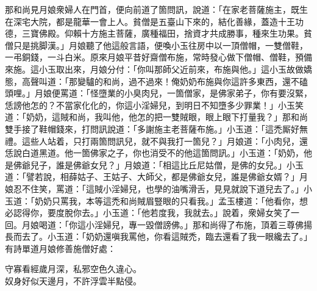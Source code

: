 那和尚見月娘衆婦人在門首，便向前道了箇問訊，說道：「在家老菩薩施主，既生在深宅大院，都是龍華一會上人。貧僧是五臺山下來的，結化善緣，蓋造十王功德，三寶佛殿。仰賴十方施主菩薩，廣種福田，捨資才共成勝事，種來生功果。貧僧只是挑脚漢。」月娘聽了他這般言語，便喚小玉往房中以一頂僧帽，一雙僧鞋，一弔銅錢，一斗白米。原來月娘平昔好齋僧布施，常時發心做下僧帽、僧鞋，預備來施。這小玉取出來，月娘分付：「你叫那師父近前來，布施與他。」這小玉故做嬌態，高聲叫道：「那變驢的和尚，過不過來！{}俺奶奶布施與你這許多東西，還不磕頭哩。」月娘便罵道：「怪墮業的小臭肉兒，一箇僧家，是佛家弟子，你有要沒緊，恁謗他怎的？不當家化化的，你這小淫婦兒，到明日不知墮多少罪業！」小玉笑道：「奶奶，這賊和尚，我叫他，他怎的把一雙賊眼，眼上眼下打量我？」那和尚雙手接了鞋帽錢來，打問訊說道：「多謝施主老菩薩布施。」小玉道：「這禿厮好無禮。這些人站着，只打兩箇問訊兒，就不與我打一箇兒？」月娘道：「小肉兒，還恁說白道黑道。他一箇佛家之子，你也消受不的他這箇問訊。」小玉道：「奶奶，他是佛爺兒子，誰是佛爺女兒？」{}月娘道：「相這比丘尼姑僧，是佛的女兒。」小玉道：「譬若說，相薛姑子、王姑子、大師父，都是佛爺女兒，誰是佛爺女婿？」月娘忍不住笑，罵道：「這賊小淫婦兒，也學的油嘴滑舌，見見就說下道兒去了。」小玉道：「奶奶只罵我，本等這禿和尚賊眉豎眼的只看我。」{}孟玉樓道：「他看你，想必認得你，要度脫你去。」小玉道：「他若度我，我就去。」說着，衆婦女笑了一回。月娘喝道：「你這小淫婦兒，專一毀僧謗佛。」那和尚得了布施，頂着三尊佛揚長而去了。小玉道：「奶奶還嗔我罵他，你看這賊禿，臨去還看了我一眼纔去了。」有詩單道月娘修善施僧好處：

\begin{myquote}
守寡看經歲月深，私邪空色久違心。\\奴身好似天邊月，不許浮雲半點侵。
\end{myquote}

